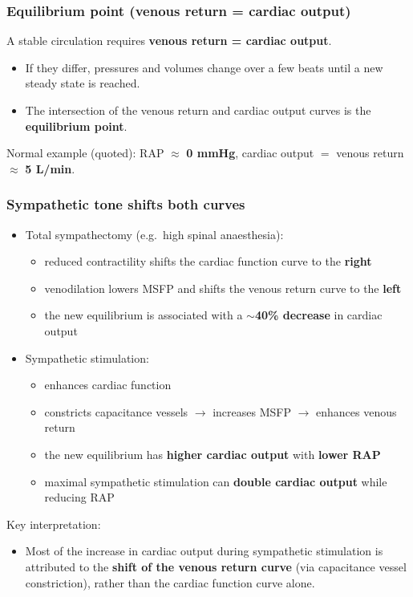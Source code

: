 \documentclass[11pt,a4paper]{article}
\begin{document}
\subsubsection{Equilibrium point (venous return = cardiac output)}
A stable circulation requires \textbf{venous return = cardiac output}.
\begin{itemize}
\item If they differ, pressures and volumes change over a few beats until a new steady state is reached.
\item The intersection of the venous return and cardiac output curves is the \textbf{equilibrium point}.
\end{itemize}
Normal example (quoted): RAP $\approx$ \textbf{0 mmHg}, cardiac output $=$ venous return $\approx$ \textbf{5 L/min}.

\subsubsection{Sympathetic tone shifts both curves}
\begin{itemize}
\item Total sympathectomy (e.g.\ high spinal anaesthesia):
  \begin{itemize}
  \item reduced contractility shifts the cardiac function curve to the \textbf{right}
  \item venodilation lowers MSFP and shifts the venous return curve to the \textbf{left}
  \item the new equilibrium is associated with a \textbf{$\sim$40\% decrease} in cardiac output
  \end{itemize}
\item Sympathetic stimulation:
  \begin{itemize}
  \item enhances cardiac function
  \item constricts capacitance vessels $\rightarrow$ increases MSFP $\rightarrow$ enhances venous return
  \item the new equilibrium has \textbf{higher cardiac output} with \textbf{lower RAP}
  \item maximal sympathetic stimulation can \textbf{double cardiac output} while reducing RAP
  \end{itemize}
\end{itemize}
Key interpretation:
\begin{itemize}
\item Most of the increase in cardiac output during sympathetic stimulation is attributed to the \textbf{shift of the venous return curve} (via capacitance vessel constriction), rather than the cardiac function curve alone.
\end{itemize}
\end{document}
